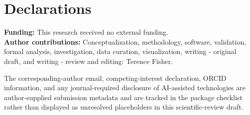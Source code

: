 \section{Declarations}\label{declarations}

\textbf{Funding:} This research received no external funding.\\
\textbf{Author contributions:} Conceptualization, methodology, software,
validation, formal analysis, investigation, data curation,
visualization, writing - original draft, and writing - review and
editing: Terence Fisher.

The corresponding-author email, competing-interest declaration, ORCID
information, and any journal-required disclosure of AI-assisted
technologies are author-supplied submission metadata and are tracked in
the package checklist rather than displayed as unresolved placeholders
in this scientific-review draft.
